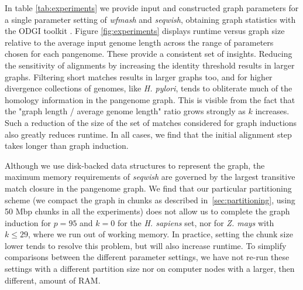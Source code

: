 \documentclass{bioinfo}
\theoremstyle{definition}
\begin{document}

In table \ref{tab:experiments} we provide input and constructed graph parameters for a single parameter setting of \textit{wfmash} and \textit{seqwish}, obtaining graph statistics with the ODGI toolkit \citep{Guarracino_2021}.
Figure \ref{fig:experiments} displays runtime versus graph size relative to the average input genome length across the range of parameters chosen for each pangenome.
These provide a consistent set of insights.
Reducing the sensitivity of alignments by increasing the identity threshold results in larger graphs.
Filtering short matches results in larger graphs too, and for higher divergence collections of genomes, like \textit{H. pylori}, tends to obliterate much of the homology information in the pangenome graph.
This is visible from the fact that the "graph length / average genome length" ratio grows strongly as $k$ increases.
Such a reduction of the size of the set of matches considered for graph inductions also greatly reduces runtime.
In all cases, we find that the initial alignment step takes longer than graph induction.


Although we use disk-backed data structures to represent the graph, the maximum memory requirements of \textit{seqwish} are governed by the largest transitive match closure in the pangenome graph.
We find that our particular partitioning scheme (we compact the graph in chunks as described in~\ref{sec:partitioning}, using 50 Mbp chunks in all the experiments) does not allow us to complete the graph induction for $p=95$ and $k=0$ for the \textit{H. sapiens} set, nor for \textit{Z. mays} with $k \leq 29$, where we run out of working memory.
In practice, setting the chunk size lower tends to resolve this problem, but will also increase runtime.
To simplify comparisons between the different parameter settings, we have not re-run these settings with a different partition size nor on computer nodes with a larger, then different, amount of RAM.
\end{document}
